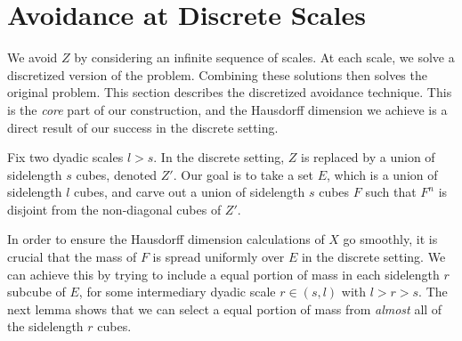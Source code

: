 \documentclass[usenames,dvipsnames]{article}
\theoremstyle{plain}
\theoremstyle{plain}
\begin{document}
\section{Avoidance at Discrete Scales}

We avoid $Z$ by considering an infinite sequence of scales. At each scale, we solve a discretized version of the problem. Combining these solutions then solves the original problem. This section describes the discretized avoidance technique. This is the {\it core} part of our construction, and the Hausdorff dimension we achieve is a direct result of our success in the discrete setting.

Fix two dyadic scales $l > s$. In the discrete setting, $Z$ is replaced by a union of sidelength $s$ cubes, denoted $Z'$. Our goal is to take a set $E$, which is a union of sidelength $l$ cubes, and carve out a union of sidelength $s$ cubes $F$ such that $F^n$ is disjoint from the non-diagonal cubes of $Z'$.

In order to ensure the Hausdorff dimension calculations of $X$ go smoothly, it is crucial that the mass of $F$ is spread uniformly over $E$ in the discrete setting. We can achieve this by trying to include a equal portion of mass in each sidelength $r$ subcube of $E$, for some intermediary dyadic scale $r \in (s,l)$ with $l > r > s$. The next lemma shows that we can select a equal portion of mass from {\it almost} all of the sidelength $r$ cubes.
\end{document}
